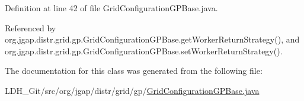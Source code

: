 Definition at line 42 of file Grid\-Configuration\-G\-P\-Base.\-java.



Referenced by org.\-jgap.\-distr.\-grid.\-gp.\-Grid\-Configuration\-G\-P\-Base.\-get\-Worker\-Return\-Strategy(), and org.\-jgap.\-distr.\-grid.\-gp.\-Grid\-Configuration\-G\-P\-Base.\-set\-Worker\-Return\-Strategy().



The documentation for this class was generated from the following file\-:\begin{DoxyCompactItemize}
\item 
L\-D\-H\-\_\-\-Git/src/org/jgap/distr/grid/gp/\hyperlink{_grid_configuration_g_p_base_8java}{Grid\-Configuration\-G\-P\-Base.\-java}\end{DoxyCompactItemize}
